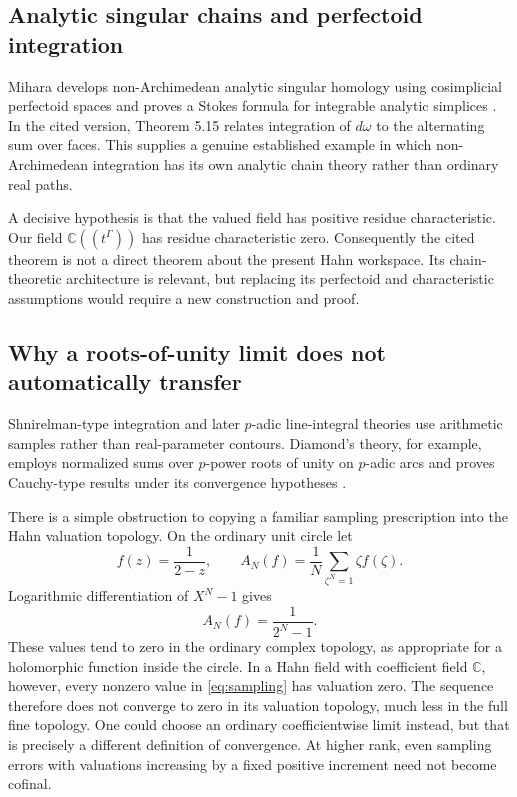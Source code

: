 \documentclass[11pt,letterpaper]{article}
\theoremstyle{definition}
\theoremstyle{remark}
\newcommand{\C}{\mathbb C}
\numberwithin{equation}{section}
\begin{document}
\subsection{Analytic singular chains and perfectoid integration}
Mihara develops non-Archimedean analytic singular homology using cosimplicial perfectoid spaces and proves a Stokes formula for integrable analytic simplices \cite{Mihara}. In the cited version, Theorem 5.15 relates integration of $d\omega$ to the alternating sum over faces. This supplies a genuine established example in which non-Archimedean integration has its own analytic chain theory rather than ordinary real paths.

A decisive hypothesis is that the valued field has positive residue characteristic. Our field $\C((t^\Gamma))$ has residue characteristic zero. Consequently the cited theorem is not a direct theorem about the present Hahn workspace. Its chain-theoretic architecture is relevant, but replacing its perfectoid and characteristic assumptions would require a new construction and proof.

\subsection{Why a roots-of-unity limit does not automatically transfer}
Shnirelman-type integration and later $p$-adic line-integral theories use arithmetic samples rather than real-parameter contours. Diamond's theory, for example, employs normalized sums over $p$-power roots of unity on $p$-adic arcs and proves Cauchy-type results under its convergence hypotheses \cite{Diamond}.

There is a simple obstruction to copying a familiar sampling prescription into the Hahn valuation topology. On the ordinary unit circle let
\[
f(z)=\frac1{2-z},\qquad
A_N(f)=\frac1N\sum_{\zeta^N=1}\zeta f(\zeta).
\]
Logarithmic differentiation of $X^N-1$ gives
\begin{equation}\label{eq:sampling}
A_N(f)=\frac1{2^N-1}.
\end{equation}
These values tend to zero in the ordinary complex topology, as appropriate for a holomorphic function inside the circle. In a Hahn field with coefficient field $\C$, however, every nonzero value in \eqref{eq:sampling} has valuation zero. The sequence therefore does not converge to zero in its valuation topology, much less in the full fine topology. One could choose an ordinary coefficientwise limit instead, but that is precisely a different definition of convergence. At higher rank, even sampling errors with valuations increasing by a fixed positive increment need not become cofinal.
\end{document}
